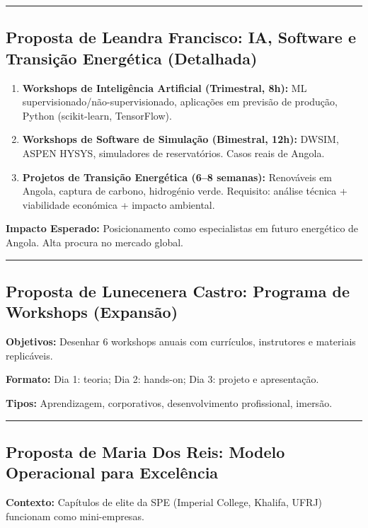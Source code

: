 \documentclass[12pt,a4paper]{article}
\newcommand{\proposalsep}{%
  \vspace{6pt}%
  {\color{gold}\rule{0.35\linewidth}{0.7pt}}%
  \vspace{4pt}%
}
\begin{document}
\proposalsep

\subsection{Proposta de Leandra Francisco: IA, Software e Transição Energética (Detalhada)}

\begin{enumerate}
    \item \textbf{Workshops de Inteligência Artificial (Trimestral, 8h):} ML supervisionado/não-supervisionado, aplicações em previsão de produção, Python (scikit-learn, TensorFlow).
    \item \textbf{Workshops de Software de Simulação (Bimestral, 12h):} DWSIM, ASPEN HYSYS, simuladores de reservatórios. Casos reais de Angola.
    \item \textbf{Projetos de Transição Energética (6–8 semanas):} Renováveis em Angola, captura de carbono, hidrogénio verde. Requisito: análise técnica + viabilidade económica + impacto ambiental.
\end{enumerate}

\begin{infobox}
\small\textbf{Impacto Esperado:} Posicionamento como especialistas em futuro energético de Angola. Alta procura no mercado global.
\end{infobox}

\proposalsep

\subsection{Proposta de Lunecenera Castro: Programa de Workshops (Expansão)}

\textbf{Objetivos:} Desenhar 6 workshops anuais com currículos, instrutores e materiais replicáveis.

\textbf{Formato:} Dia 1: teoria; Dia 2: hands-on; Dia 3: projeto e apresentação.

\textbf{Tipos:} Aprendizagem, corporativos, desenvolvimento profissional, imersão.

\proposalsep

\subsection{Proposta de Maria Dos Reis: Modelo Operacional para Excelência}

\textbf{Contexto:} Capítulos de elite da SPE (Imperial College, Khalifa, UFRJ) funcionam como mini-empresas.
\end{document}
